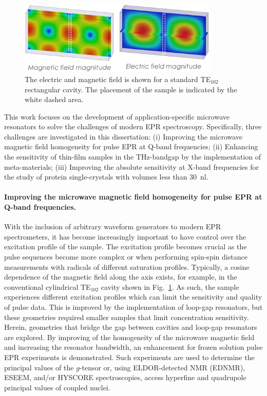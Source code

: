 \begin{figure}[ht]
 \centering
 \includegraphics[width=0.85\textwidth]{Kapitel/Ch1-images/Cavity.eps}
 \caption[Standard TE102 Caivty.]{The electric and magnetic field is shown for a standard TE$_{102}$ rectangular cavity. The placement of the sample is indicated by the white dashed area.}
 \label{fig:cavity}
\end{figure}

This work focuses on the development of application-specific microwave resonators to solve the challenges of modern EPR spectroscopy. Specifically, three challenges are investigated in this dissertation: (i) Improving the microwave magnetic field homogeneity for pulse EPR at Q-band frequencies; (ii) Enhancing the sensitivity of thin-film samples in the THz-bandgap by the implementation of meta-materials; (iii) Improving the absolute sensitivity at X-band frequencies for the study of protein single-crystals with volumes less than 30~nl.

\hspace{1em}
\paragraph*{Improving the microwave magnetic field homogeneity for pulse EPR at Q-band frequencies.}
With the inclusion of arbitrary waveform generators to modern EPR spectrometers, it has become increasingly important to have control over the excitation profile of the sample. \cite{DOLL201418,WILI201826} The excitation profile becomes crucial as the pulse sequences become more complex \cite{MILIKISYANTS200948,C7CP01488K,C6CP03067J,BREITGOFF2019106560} or when performing spin-spin distance measurements with radicals of different saturation profiles. \cite{C8CP01276H} Typically, a cosine dependence of the magnetic field along the axis exists, for example, in the conventional cylindrical TE$_{\text{102}}$ cavity shown in Fig.~\ref{fig:cavity}. As such, the sample experiences different excitation profiles which can limit the sensitivity and quality of pulse data. This is improved by the implementation of loop-gap resonators, but these geometries required smaller samples that limit concentration sensitivity. Herein, geometries that bridge the gap between cavities and loop-gap resonators are explored. By improving of the homogeneity of the microwave magnetic field\cite{HydeUFRev2019} and increasing the resonator bandwidth, an enhancement for frozen solution pulse EPR experiments is demonstrated. Such experiments are used to determine the principal values of the $g$-tensor or, using ELDOR-detected NMR (EDNMR), ESEEM, and/or HYSCORE spectroscopies, access hyperfine and quadrupole principal values of coupled nuclei. \cite{Harmer2009}

